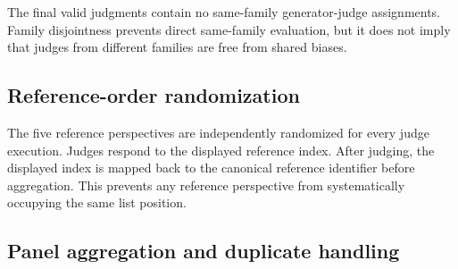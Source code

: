 \documentclass[11pt,a4paper]{article}
\begin{document}
\begin{table}[htbp]
\centering
\caption{Family-disjoint judge substitutions.}
\label{tab:judge_substitutions}
\end{table}

The final valid judgments contain no same-family generator-judge assignments. Family disjointness prevents direct same-family evaluation, but it does not imply that judges from different families are free from shared biases.

\subsection{Reference-order randomization}
\label{app:reference_randomization}

The five reference perspectives are independently randomized for every judge execution. Judges respond to the displayed reference index. After judging, the displayed index is mapped back to the canonical reference identifier before aggregation. This prevents any reference perspective from systematically occupying the same list position.

\subsection{Panel aggregation and duplicate handling}
\label{app:recall_aggregation}
\end{document}
